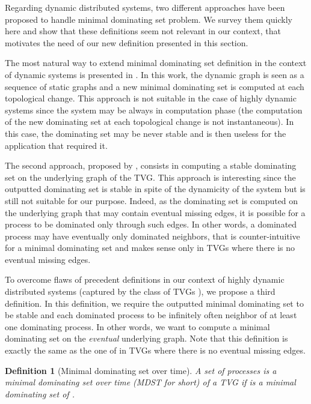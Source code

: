 \documentclass{article}
\newtheorem{definition}{Definition}
\begin{document}
Regarding dynamic distributed systems, two different approaches have been proposed to handle minimal dominating set problem. We survey them quickly here and show that these definitions seem not relevant in our context, that motivates the need of our new definition presented in this section.

The most natural way to extend minimal dominating set definition in the context of dynamic systems is presented in \cite{WDCG12}. In this work, the dynamic graph is seen as a sequence of static graphs and a new minimal dominating set is computed at each topological change. This approach is not suitable in the case of highly dynamic systems since the system may be always in computation phase (the computation of the new dominating set at each topological change is not instantaneous). In this case, the dominating set may be never stable and is then useless for the application that required it.

The second approach, proposed by \cite{CF13r}, consists in computing a stable dominating set on the underlying graph of the TVG. This approach is interesting since the outputted dominating set is stable in spite of the dynamicity of the system but is still not suitable for our purpose. Indeed, as the dominating set is computed on the underlying graph that may contain eventual missing edges, it is possible for a process to be dominated only through such edges. In other words, a dominated process may have eventually only dominated neighbors, that is counter-intuitive for a minimal dominating set and makes sense only in TVGs where there is no eventual missing edges.

To overcome flaws of precedent definitions in our context of highly dynamic distributed systems (captured by the class of TVGs ), we propose a third definition. In this definition,  we require the outputted minimal dominating set to be stable and each dominated process to be infinitely often neighbor of at least one dominating process. In other words, we want to compute a minimal dominating set on the \emph{eventual} underlying graph. Note that this definition is exactly the same as the one of \cite{CF13r} in TVGs where there is no eventual missing edges. 

\begin{definition}[Minimal dominating set over time] 
A set of processes  is a minimal dominating set over time (MDST for short) of a TVG  if  is a minimal dominating set of .
\end{definition}
\end{document}
